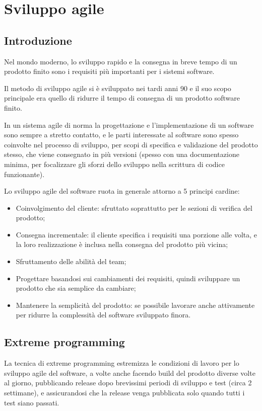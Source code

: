 \documentclass[a4paper, 10pt]{article}
\begin{document}
	\section{Sviluppo agile}
		\subsection{Introduzione}
		Nel mondo moderno, lo sviluppo rapido e la consegna in breve tempo di un prodotto finito sono i requisiti più importanti per i sistemi software.
		
		Il metodo di sviluppo agile si è sviluppato nei tardi anni 90 e il suo scopo principale era quello di ridurre il tempo di consegna di un prodotto software finito. 
		
		In un sistema agile di norma la progettazione e l'implementazione di un software sono sempre a stretto contatto, e le parti interessate al software sono spesso coinvolte nel processo di sviluppo, per scopi di specifica e validazione del prodotto stesso, che viene consegnato in più versioni (spesso con una documentazione minima, per focalizzare gli sforzi dello sviluppo nella scrittura di codice funzionante).
		
		Lo sviluppo agile del software ruota in generale attorno a 5 principi cardine:
		\begin{itemize}
			\item Coinvolgimento del cliente: sfruttato soprattutto per le sezioni di verifica del prodotto;
			
			\item Consegna incrementale: il cliente specifica i requisiti una porzione alle volta, e la loro realizzazione è inclusa nella consegna del prodotto più vicina;
			
			\item Sfruttamento delle abilità del team;
			
			\item Progettare basandosi sui cambiamenti dei requisiti, quindi sviluppare un prodotto che sia semplice da cambiare;
			
			\item Mantenere la semplicità del prodotto: se possibile lavorare anche attivamente per ridurre la complessità del software sviluppato finora.
		\end{itemize}
	
		\subsection{Extreme programming}
		La tecnica di extreme programming estremizza le condizioni di lavoro per lo sviluppo agile del software, a volte anche facendo build del prodotto diverse volte al giorno, pubblicando release dopo brevissimi periodi di sviluppo e test (circa 2 settimane), e assicurandosi che la release venga pubblicata solo quando tutti i test siano passati.
		
\end{document}
